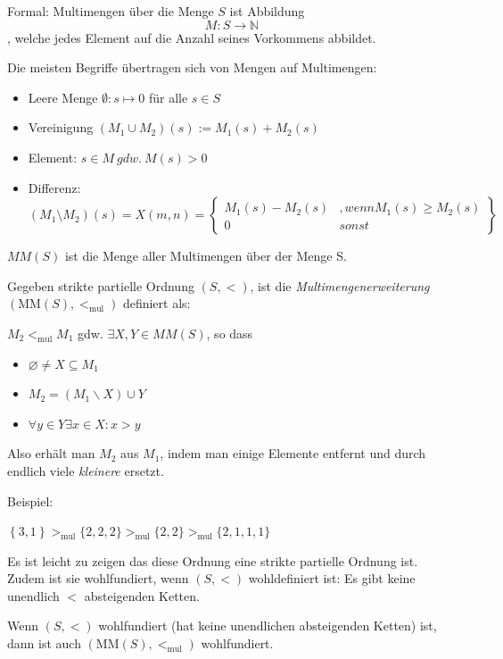 Formal: Multimengen über die Menge $S$ ist Abbildung $$M:S\mathbb{\rightarrow N}$$, welche jedes Element auf die Anzahl seines Vorkommens abbildet.

Die meisten Begriffe übertragen sich von Mengen auf Multimengen:

\begin{itemize}
	\item Leere Menge $\emptyset: s \mapsto 0$ für alle $s \in S$
	\item Vereinigung $(M_1 \cup M_2)(s) := M_1(s) + M_2(s)$ 
	\item Element: $s \in M\ gdw.\ M(s)>0$
	\item Differenz: $(M_1 \setminus M_2)(s) = X(m,n) = \left\{\begin{array}{lr}
        M_1(s) - M_2(s) &, wenn M_1(s) \geq M_2(s) \\
        0 & sonst
        \end{array}\right\}$
\end{itemize}

$MM(S)$ ist die Menge aller Multimengen über der Menge S.

Gegeben strikte partielle Ordnung $\left( S, < \right)$, ist die
\emph{Multimengenerweiterung} $\left( \text{MM}\left( S \right), <_{\text{mul}} \right)$ definiert als: 

$M_{2} <_{\text{mul}}M_{1}$ gdw. $\exists X,Y \in MM(S)$, so dass

\begin{itemize}
\item
  $\varnothing \neq X \subseteq M_{1}$
\item
  $M_{2} = \left( M_{1} \smallsetminus X \right) \cup Y$
\item
  $\forall y \in Y\exists x \in X : x > y$
\end{itemize}

Also erhält man $M_2$ aus $M_1$, indem man einige Elemente entfernt und durch endlich viele \emph{kleinere} ersetzt.

Beispiel:

$\left\{ 3,1 \right\} >_{\text{mul}}\{ 2,2,2\} >_{\text{mul}}\{ 2,2\} >_{\text{mul}}\{ 2,1,1,1\}$

Es ist leicht zu zeigen das diese Ordnung eine strikte partielle Ordnung ist.  Zudem ist sie wohlfundiert, wenn $(S,<)$ wohldefiniert ist: Es gibt keine unendlich $<$ absteigenden Ketten.

\setcounter{definition}{5}
\begin{theorem}

Wenn $\left( S, < \right)$ wohlfundiert (hat keine unendlichen
absteigenden Ketten) ist, dann ist auch $\left( \text{MM}\left( S \right), <_{\text{mul}} \right)$
wohlfundiert.
\end{theorem}

